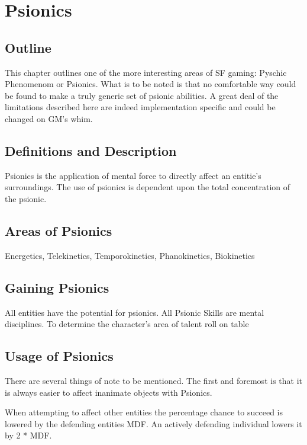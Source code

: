 \chapter{Psionics}

\section{Outline}

This chapter outlines one of the more interesting areas of SF gaming: 
Pyschic Phenomenom or Psionics. What is to be noted is that no 
comfortable way could be found to make a truly generic set of psionic 
abilities. A great deal of the limitations described here are indeed 
implementation specific and could be changed on GM's whim.

\section{Definitions and Description}

Psionics is the application of mental force to directly affect an entitie's
surroundings. The use of psionics is dependent upon the total concentration
of the psionic. 


\section{Areas of Psionics}

Energetics, Telekinetics, Temporokinetics, Phanokinetics, Biokinetics

\section{Gaining Psionics}

All entities have the potential for psionics. 
All Psionic Skills are mental disciplines.
To determine the character's area of talent roll on table

\section{Usage of Psionics}

There are several things of note to be mentioned. The first and foremost
is that it is always easier to affect inanimate objects with Psionics.

When attempting to affect other entities the percentage chance to succeed
is lowered by the defending entities MDF. An actively defending individual
lowers it by 2 * MDF.

